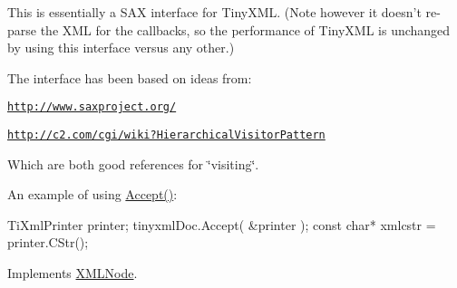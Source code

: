 This is essentially a S\-A\-X interface for Tiny\-X\-M\-L. (Note however it doesn't re-\/parse the X\-M\-L for the callbacks, so the performance of Tiny\-X\-M\-L is unchanged by using this interface versus any other.)

The interface has been based on ideas from\-:
\begin{DoxyItemize}
\item \href{http://www.saxproject.org/}{\tt http\-://www.\-saxproject.\-org/}
\item \href{http://c2.com/cgi/wiki?HierarchicalVisitorPattern}{\tt http\-://c2.\-com/cgi/wiki?\-Hierarchical\-Visitor\-Pattern}
\end{DoxyItemize}

Which are both good references for \char`\"{}visiting\char`\"{}.

An example of using \hyperlink{classtinyxml2_1_1_x_m_l_document_a66d46e7527ec62912b49400b27137eba}{Accept()}\-: \begin{DoxyVerb}TiXmlPrinter printer;
tinyxmlDoc.Accept( &printer );
const char* xmlcstr = printer.CStr();
\end{DoxyVerb}
 

Implements \hyperlink{classtinyxml2_1_1_x_m_l_node_a22a4129c1b347686a3579664d9278cce}{X\-M\-L\-Node}.

